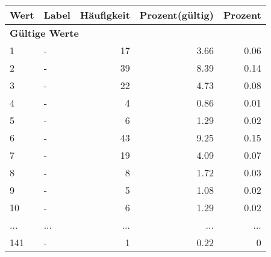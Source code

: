      \begin{longtable}{lXrrr}
     \toprule
     \textbf{Wert} & \textbf{Label} & \textbf{Häufigkeit} & \textbf{Prozent(gültig)} & \textbf{Prozent} \\
     \endhead
     \midrule
     \multicolumn{5}{l}{\textbf{Gültige Werte}}\\
        1 & \multicolumn{1}{X}{-} & %
          \num{17} &
          \num[round-mode=places,round-precision=2]{3.66} &
          \num[round-mode=places,round-precision=2]{0.06} \\
        2 & \multicolumn{1}{X}{-} & %
          \num{39} &
          \num[round-mode=places,round-precision=2]{8.39} &
          \num[round-mode=places,round-precision=2]{0.14} \\
        3 & \multicolumn{1}{X}{-} & %
          \num{22} &
          \num[round-mode=places,round-precision=2]{4.73} &
          \num[round-mode=places,round-precision=2]{0.08} \\
        4 & \multicolumn{1}{X}{-} & %
          \num{4} &
          \num[round-mode=places,round-precision=2]{0.86} &
          \num[round-mode=places,round-precision=2]{0.01} \\
        5 & \multicolumn{1}{X}{-} & %
          \num{6} &
          \num[round-mode=places,round-precision=2]{1.29} &
          \num[round-mode=places,round-precision=2]{0.02} \\
        6 & \multicolumn{1}{X}{-} & %
          \num{43} &
          \num[round-mode=places,round-precision=2]{9.25} &
          \num[round-mode=places,round-precision=2]{0.15} \\
        7 & \multicolumn{1}{X}{-} & %
          \num{19} &
          \num[round-mode=places,round-precision=2]{4.09} &
          \num[round-mode=places,round-precision=2]{0.07} \\
        8 & \multicolumn{1}{X}{-} & %
          \num{8} &
          \num[round-mode=places,round-precision=2]{1.72} &
          \num[round-mode=places,round-precision=2]{0.03} \\
        9 & \multicolumn{1}{X}{-} & %
          \num{5} &
          \num[round-mode=places,round-precision=2]{1.08} &
          \num[round-mode=places,round-precision=2]{0.02} \\
        10 & \multicolumn{1}{X}{-} & %
          \num{6} &
          \num[round-mode=places,round-precision=2]{1.29} &
          \num[round-mode=places,round-precision=2]{0.02} \\
       ... & ... & ... & ... & ... \\
        141 & \multicolumn{1}{X}{-} & %
          \num{1} &
          \num[round-mode=places,round-precision=2]{0.22} &
          \num[round-mode=places,round-precision=2]{0} \\


\end{longtable}
